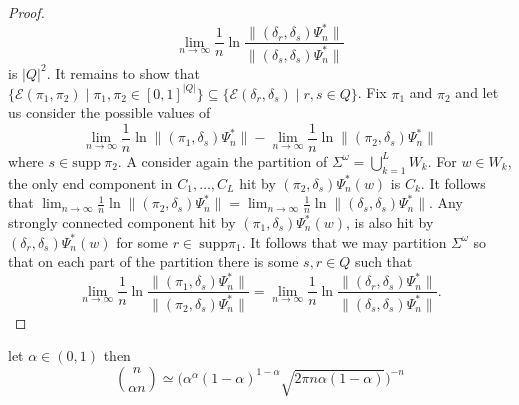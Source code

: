 \documentclass[a4paper,UKenglish,cleveref, autoref,mathscr]{lipics-v2019}
\newcommand{\Epsilon}{\mathcal{E}}
\newcommand{\1}{\mathbbm{1}}
\newcommand{\supp}{\mathrm{supp}}
\begin{document}
\begin{proof}
\begin{equation*}
\lim_{n \rightarrow \infty} \frac{1}{n} \ln \frac{\| (\delta_r, \delta_s) \Psi_n^* \|}{\| (\delta_s, \delta_s) \Psi_n^* \|}
\end{equation*}
is $|Q|^2$. It remains to show that $\{\Epsilon(\pi_1, \pi_2) \mid \pi_1, \pi_2 \in [0,1]^{|Q|}\} \subseteq \{\Epsilon(\delta_r, \delta_s) \mid r, s \in Q\}$. Fix $\pi_1$ and $\pi_2$ and let us consider the possible values of 
\begin{equation*}
\lim_{n \rightarrow \infty} \frac1n \ln \| (\pi_1, \delta_s) \Psi_n^*\| - \lim_{n \rightarrow \infty} \frac1n \ln \| (\pi_2, \delta_s) \Psi_n^*\|
\end{equation*}
where $s \in \supp ~\pi_2$. A consider again the partition of $\Sigma^\omega = \bigcup_{k = 1}^L W_k$. For $w \in W_k$, the only end component in $C_1, \dots, C_L$ hit by $(\pi_2, \delta_s) \Psi^*_n(w)$ is $C_k$. It follows that $\lim_{n \rightarrow \infty} \frac1n \ln \| (\pi_2, \delta_s) \Psi_n^* \| = \lim_{n \rightarrow \infty} \frac1n \ln \| (\delta_s, \delta_s) \Psi_n^* \|$. Any strongly connected component hit by $(\pi_1, \delta_s) \Psi_n^*(w)$, is also hit by $(\delta_r, \delta_s) \Psi_n^*(w)$ for some $r \in ~\supp \pi_1$.  It follows that we may partition $\Sigma^\omega$ so that on each part of the partition there is some $s, r \in Q$ such that 
\begin{equation*}
\lim_{n \rightarrow \infty} \frac1n \ln \frac{ \| (\pi_1, \delta_s) \Psi_n^*\| }{ \| (\pi_2, \delta_s) \Psi_n^*\|} = \lim_{n \rightarrow \infty} \frac1n \ln \frac{ \| (\delta_r, \delta_s) \Psi_n^*\| }{ \| (\delta_s, \delta_s) \Psi_n^*\|}.
\end{equation*}
\end{proof}

\begin{lemma}
let $\alpha \in (0,1)$ then
\begin{equation*}
{n \choose \alpha n } \simeq \Big( \alpha^\alpha (1 - \alpha)^{1 - \alpha} \sqrt{2\pi n \alpha (1 - \alpha)} \Big)^{-n}
\end{equation*}
\end{lemma}
\end{document}
